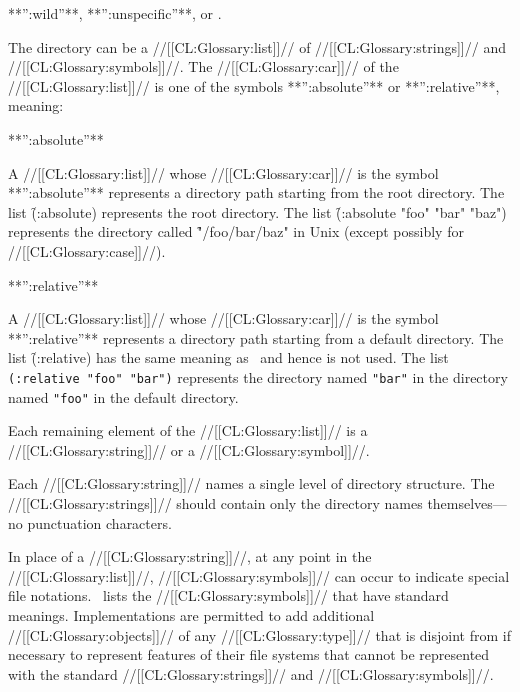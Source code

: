 **'':wild''**, **'':unspecific''**, or \nil.

The directory can be a //[[CL:Glossary:list]]// of //[[CL:Glossary:strings]]// and //[[CL:Glossary:symbols]]//. 
The //[[CL:Glossary:car]]// of the //[[CL:Glossary:list]]// is one of the symbols **'':absolute''** or 
**'':relative''**, meaning:

\beginlist

\item{**'':absolute''**}

  A //[[CL:Glossary:list]]// whose //[[CL:Glossary:car]]// is the symbol **'':absolute''** represents 
  a directory path starting from the root directory.  The list 
  \f{(:absolute)} represents the root directory.  The list 
  \f{(:absolute "foo" "bar" "baz")} represents the directory called
  \f{"/foo/bar/baz"} in Unix (except possibly for //[[CL:Glossary:case]]//).
 
\item{**'':relative''**}

  A //[[CL:Glossary:list]]// whose //[[CL:Glossary:car]]// is the symbol **'':relative''** represents 
  a directory path starting from a default directory.  
  The list \f{(:relative)} has the same meaning as \nil\ and hence is not used.
  The list {\tt (:relative "foo" "bar")} represents the directory named {\tt "bar"} 
  in the directory named {\tt "foo"} in the default directory.

\endlist

Each remaining element of the //[[CL:Glossary:list]]// is a //[[CL:Glossary:string]]// or a //[[CL:Glossary:symbol]]//.

Each //[[CL:Glossary:string]]// names a single level of directory structure.
The //[[CL:Glossary:strings]]// should contain only the directory names 
themselves---no punctuation characters.

In place of a //[[CL:Glossary:string]]//, at any point in the //[[CL:Glossary:list]]//, //[[CL:Glossary:symbols]]// 
can occur to indicate special file notations.
\Thenextfigure\ lists the //[[CL:Glossary:symbols]]// that have standard meanings.
Implementations are permitted to add additional //[[CL:Glossary:objects]]// 
of any //[[CL:Glossary:type]]// that is disjoint from 
if necessary to represent features of their file systems that cannot be
represented with the standard //[[CL:Glossary:strings]]// and //[[CL:Glossary:symbols]]//.


